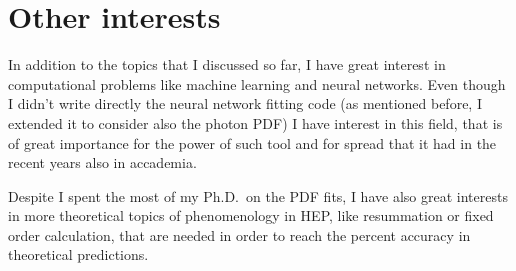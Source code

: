 \documentclass[11pt,a4paper]{moderncv}        %
\begin{document}
\section{Other interests}

In addition to the topics that I discussed so far, I have great interest
in computational problems like machine learning and neural networks.
Even though I didn't write directly the neural network fitting code (as mentioned before, I extended it to consider also the photon PDF)
I have interest in this field, that is of great importance for the power of such tool and for spread that it had in the recent years
also in accademia.

Despite I spent the most of my Ph.D.\ on the PDF fits, I have also great interests in more theoretical topics of phenomenology in HEP,
like resummation or fixed order calculation, that are needed in order to reach the percent accuracy in theoretical predictions.



\end{document}
